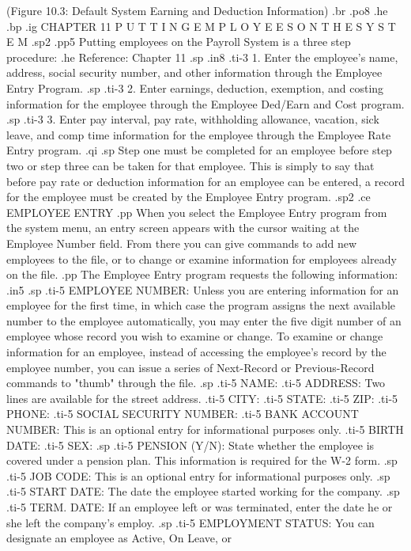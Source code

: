     (Figure 10.3: Default System Earning and Deduction Information)
.br
.po8
.he
.bp
.ig
CHAPTER 11
P U T T I N G	E M P L O Y E E S   O N   T H E   S Y S T E M
.sp2
.pp5
Putting employees on the Payroll System is a three step procedure:
.he Reference: Chapter 11
.sp
.in8
.ti-3
1. Enter the employee's name, address, social security number,
and other information through the Employee Entry Program.
.sp
.ti-3
2. Enter earnings, deduction, exemption, and costing information for the
employee through the Employee Ded/Earn and Cost program.
.sp
.ti-3
3. Enter pay interval, pay rate, withholding allowance,
vacation, sick leave, and comp time information
for the employee through the Employee Rate Entry program.
.qi
.sp
Step one must
be completed for an employee before step two or
step three can be taken for
that employee.	This is simply to say that before pay rate or
deduction information for an employee can be entered, a record for
the employee must be created by the Employee Entry program.
.sp2
.ce
EMPLOYEE ENTRY
.pp
When you select the Employee Entry program from the system menu,
an entry screen appears with the cursor waiting
at the Employee Number field.  From there you can give commands
to add new employees
to the file, or to change or examine information for employees
already on the file.
.pp
The Employee Entry program requests the following information:
.in5
.sp
.ti-5
EMPLOYEE NUMBER: Unless you are entering information for an employee
for the first time, in which case the program assigns the next available
number to the employee automatically,
you may enter the five digit number of an employee
whose record you wish to examine or change.  To examine
or change information for an employee, instead of accessing
the employee's record by the employee number, you can
issue a series of
Next-Record or Previous-Record commands to "thumb" through the file.
.sp
.ti-5
NAME:
.ti-5
ADDRESS: Two lines are available for the street address.
.ti-5
CITY:
.ti-5
STATE:
.ti-5
ZIP:
.ti-5
PHONE:
.ti-5
SOCIAL SECURITY NUMBER:
.ti-5
BANK ACCOUNT NUMBER: This is an optional entry for informational
purposes only.
.ti-5
BIRTH DATE:
.ti-5
SEX:
.sp
.ti-5
PENSION (Y/N): State whether the employee is covered under a pension
plan.  This information is required for the W-2 form.
.sp
.ti-5
JOB CODE: This is an optional entry for informational purposes only.
.sp
.ti-5
START DATE: The date the employee started working for the company.
.sp
.ti-5
TERM. DATE: If an employee left or was terminated, enter the date he or she
left the company's employ.
.sp
.ti-5
EMPLOYMENT STATUS: You can designate an employee as Active, On Leave, or

